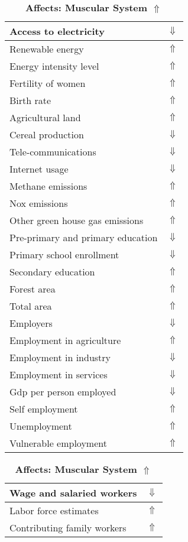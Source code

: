 \documentclass[12pt,notitlepage,oneside]{report}
\begin{document}
\begin{table}[!htb]
\caption{\textbf{Affects: Muscular System $\Uparrow$}}
\centering
\label{Correlated Socio-economic Factors0}
\begin{tabular}{|l|l|}
\hline
Access to electricity & $\Downarrow$\\ \hline
Renewable energy & $\Uparrow$\\ \hline
Energy intensity level & $\Uparrow$\\ \hline
Fertility of women & $\Uparrow$\\ \hline
Birth rate & $\Uparrow$\\ \hline
Agricultural land & $\Uparrow$\\ \hline
Cereal production & $\Downarrow$\\ \hline
Tele-communications & $\Downarrow$\\ \hline
Internet usage & $\Downarrow$\\ \hline
Methane emissions & $\Uparrow$\\ \hline
Nox emissions & $\Uparrow$\\ \hline
Other green house gas emissions & $\Uparrow$\\ \hline
Pre-primary and primary education & $\Downarrow$\\ \hline
Primary school enrollment & $\Downarrow$\\ \hline
Secondary education & $\Uparrow$\\ \hline
Forest area & $\Uparrow$\\ \hline
Total area & $\Uparrow$\\ \hline
Employers & $\Downarrow$\\ \hline
Employment in agriculture & $\Uparrow$\\ \hline
Employment in industry & $\Downarrow$\\ \hline
Employment in services & $\Downarrow$\\ \hline
Gdp per person employed & $\Downarrow$\\ \hline
Self employment & $\Uparrow$\\ \hline
Unemployment & $\Uparrow$\\ \hline
Vulnerable employment & $\Uparrow$\\ \hline
\end{tabular}
\begin{tabular}{|l|l|}
\hline
Wage and salaried workers & $\Downarrow$\\ \hline
Labor force estimates & $\Uparrow$\\ \hline
Contributing family workers & $\Uparrow$\\ \hline

\end{tabular}
\end{table}
\end{document}
